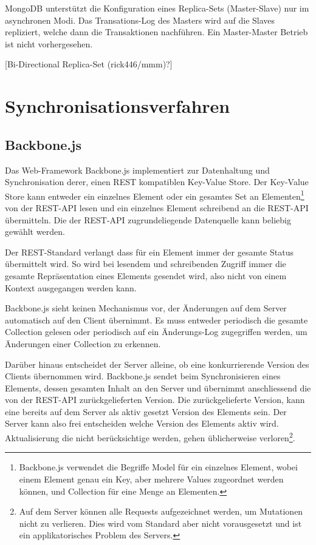 \documentclass[oneside,11pt,parskip=half,ngerman]{scrreprt}
\begin{document}
MongoDB unterstützt die Konfiguration eines Replica-Sets (Master-Slave)
nur im asynchronen Modi. Das Transations-Log des Masters wird auf die
Slaves repliziert, welche dann die Transaktionen nachführen. Ein
Master-Master Betrieb ist nicht vorhergesehen.

{[}Bi-Directional Replica-Set (rick446/mmm)?{]}

\section{Synchronisationsverfahren}\label{synchronisationsverfahren}

\subsection{Backbone.js}\label{backbone.js}

Das Web-Framework Backbone.js implementiert zur Datenhaltung und
Synchronisation derer, einen REST kompatiblen Key-Value Store. Der
Key-Value Store kann entweder ein einzelnes Element oder ein gesamtes
Set an Elementen\footnote{Backbone.js verwendet die Begriffe Model für
  ein einzelnes Element, wobei einem Element genau ein Key, aber mehrere
  Values zugeordnet werden können, und Collection für eine Menge an
  Elementen.} von der REST-API lesen und ein einzelnes Element
schreibend an die REST-API übermitteln. Die der REST-API
zugrundeliegende Datenquelle kann beliebig gewählt werden.

Der REST-Standard verlangt dass für ein Element immer der gesamte Status
übermittelt wird. So wird bei lesendem und schreibenden Zugriff immer
die gesamte Repräsentation eines Elements gesendet wird, also nicht von
einem Kontext ausgegangen werden kann. \autocite{restdissertation}

Backbone.js sieht keinen Mechanismus vor, der Änderungen auf dem Server
automatisch auf den Client übernimmt. Es muss entweder periodisch die
gesamte Collection gelesen oder periodisch auf ein Änderungs-Log
zugegriffen werden, um Änderungen einer Collection zu erkennen.

Darüber hinaus entscheidet der Server alleine, ob eine konkurrierende
Version des Clients übernommen wird. Backbone.js sendet beim
Synchronisieren eines Elements, dessen gesamten Inhalt an den Server und
übernimmt anschliessend die von der REST-API zurückgelieferten Version.
Die zurückgelieferte Version, kann eine bereits auf dem Server als aktiv
gesetzt Version des Elements sein. Der Server kann also frei entscheiden
welche Version des Elements aktiv wird. Aktualisierung die nicht
berücksichtige werden, gehen üblicherweise verloren\footnote{Auf dem
  Server können alle Requests aufgezeichnet werden, um Mutationen nicht
  zu verlieren. Dies wird vom Standard aber nicht vorausgesetzt und ist
  ein applikatorisches Problem des Servers.}.
\end{document}
